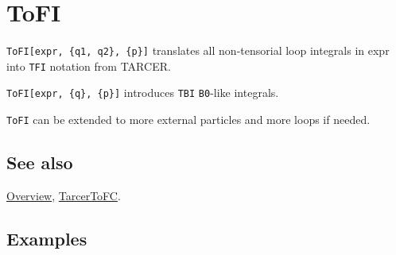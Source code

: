 \documentclass[../FeynCalcManual.tex]{subfiles}
\begin{document}
\hypertarget{tofi}{
\section{ToFI}\label{tofi}}

\texttt{ToFI[\allowbreak{}expr,\ \allowbreak{}\{\allowbreak{}q1,\ \allowbreak{}q2\},\ \allowbreak{}\{\allowbreak{}p\}]}
translates all non-tensorial loop integrals in expr into \texttt{TFI}
notation from TARCER.

\texttt{ToFI[\allowbreak{}expr,\ \allowbreak{}\{\allowbreak{}q\},\ \allowbreak{}\{\allowbreak{}p\}]}
introduces \texttt{TBI} \texttt{B0}-like integrals.

\texttt{ToFI} can be extended to more external particles and more loops
if needed.

\subsection{See also}

\hyperlink{toc}{Overview}, \hyperlink{tarcertofc}{TarcerToFC}.

\subsection{Examples}
\end{document}
